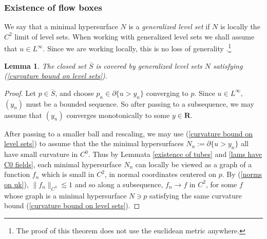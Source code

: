 \documentclass[reqno,11pt]{amsart}
\newcommand{\RR}{\mathbf{R}}
\newcommand{\dfn}[1]{\emph{#1}\index{#1}}
\newtheorem{lemma}[theorem]{Lemma}
\theoremstyle{definition}
\numberwithin{equation}{section}
\begin{document}
\subsubsection{Existence of flow boxes}
We say that a minimal hypersurface $N$ is a \dfn{generalized level set} if $N$ is locally the $C^2$ limit of level sets.
When working with generalized level sets we shall assume that $u \in L^\infty$.
Since we are working locally, this is no loss of generality \cite[Theorem 4.3]{Gorny20}.\footnote{The proof of this theorem does not use the euclidean metric anywhere.}

\begin{lemma}
The closed set $\overline S$ is covered by generalized level sets $N$ satisfying (\ref{curvature bound on level sets}).
\end{lemma}
\begin{proof}
Let $p \in \overline S$, and choose $p_n \in \partial \{u > y_n\}$ converging to $p$.
Since $u \in L^\infty$, $(y_n)$ must be a bounded sequence.
So after passing to a subsequence, we may assume that $(y_n)$ converges monotonically to some $y \in \RR$.

After passing to a smaller ball and rescaling, we may use (\ref{curvature bound on level sets}) to assume that the the minimal hypersurfaces $N_n := \partial \{u > y_n\}$ all have small curvature in $C^0$.
Thus by Lemmata \ref{existence of tubes} and \ref{lams have C0 fields}, each minimal hypersurface $N_n$ can locally be viewed as a graph of a function $f_n$ which is small in $C^2$, in normal coordinates centered on $p$.
By (\ref{norms on uk}), $\|f_n\|_{C^3} \lesssim 1$ and so along a subsequence, $f_n \to f$ in $C^2$, for some $f$ whose graph is a minimal hypersurface $N \ni p$ satisfying the same curvature bound (\ref{curvature bound on level sets}).
\end{proof}


\end{document}
